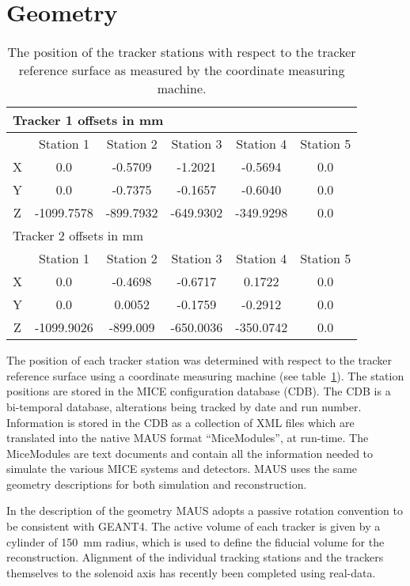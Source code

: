 \section{Geometry}
\label{sec:Geometry}
  
  \begin{table} [tbp]
  \begin{center}
  \begin{tabular} {|c|c|c|c|c|c|}
    \hline
    \multicolumn{6}{|l|}{Tracker 1 offsets in mm} \\
    \hline
    & Station 1 & Station 2 & Station 3 & Station 4 & Station 5 \\
    \hline
    X & 0.0 & -0.5709 & -1.2021 & -0.5694 & 0.0 \\
    Y & 0.0 & -0.7375 & -0.1657 & -0.6040 & 0.0 \\
    Z & -1099.7578 & -899.7932 & -649.9302 & -349.9298 & 0.0 \\
    \hline
    \hline
    \multicolumn{6}{|l|}{Tracker 2 offsets in mm} \\
    \hline
    & Station 1 & Station 2 & Station 3 & Station 4 & Station 5 \\
    \hline
    X & 0.0 & -0.4698 & -0.6717 & 0.1722 & 0.0 \\
    Y & 0.0 & 0.0052 & -0.1759 & -0.2912 & 0.0 \\
    Z & -1099.9026 & -899.009 & -650.0036 & -350.0742 & 0.0 \\
    \hline
  \end{tabular}
  \caption{\label{tab:CMM} The position of the tracker stations with respect to the tracker reference surface as measured by the coordinate measuring machine.}
  \end{center}
  \end{table}
  
  The position of each tracker station was determined with respect to the tracker reference surface using a coordinate measuring machine (see table~\ref{tab:CMM}). The station positions are stored in the MICE configuration database (CDB). The CDB is a bi-temporal database, alterations being tracked by date and run number. Information is stored in the CDB as a collection of XML files which are translated into the native MAUS format ``MiceModules'', at run-time.  The MiceModules are text documents and contain all the information needed to simulate the various MICE systems and detectors.  MAUS uses the same geometry descriptions for both simulation and reconstruction. 
  
  In the description of the geometry MAUS adopts a passive rotation convention to be consistent with GEANT4.  The active volume of each tracker is given by a cylinder of 150~mm radius, which is used to define the fiducial volume for the reconstruction. Alignment of the individual tracking stations and the trackers themselves to the solenoid axis has recently been completed using real-data.
  
